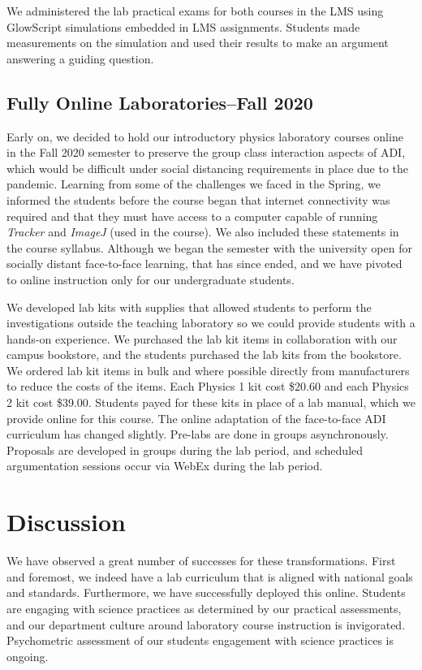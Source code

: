 \documentclass[aip, numerical, preprint]{revtex4-2}
\begin{document}
We administered the lab practical exams for both courses in the LMS using GlowScript simulations
embedded in LMS assignments. Students made measurements on the simulation and used their
results to make an argument answering a guiding question.

\subsection{Fully Online Laboratories--Fall 2020}

Early on, we decided to hold our introductory physics laboratory courses online in the Fall
2020 semester to preserve the group class interaction aspects of ADI, which would be
difficult under social distancing requirements in place due to the
pandemic.\citep{mclber20} Learning from some of the challenges we faced in the Spring, we
informed the students before the course began that internet connectivity was required and that
they must have access to a computer capable of running \emph{Tracker}\citep{bro2009} and \emph{ImageJ}\citep{schrasetal12} (used in the course). We also included these statements in the course
syllabus. Although we began the semester with the university open for socially distant
face-to-face learning, that has since ended, and we have pivoted to online instruction only for
our undergraduate students.

We developed lab kits with supplies that allowed students to perform the investigations outside
the teaching laboratory so we could provide students with a hands-on experience. We purchased
the lab kit items in collaboration with our campus bookstore, and the students purchased the
lab kits from the bookstore. We ordered lab kit items in bulk and where possible directly from
manufacturers to reduce the costs of the items. Each Physics 1 kit cost \$20.60 and each
Physics 2 kit cost \$39.00. Students payed for these kits in place of a lab manual, which we
provide online for this course.  The online adaptation of the face-to-face ADI curriculum has
changed slightly. Pre-labs are done in groups asynchronously.  Proposals are developed in
groups during the lab period, and scheduled argumentation sessions occur via WebEx during the
lab period.

\section{Discussion}
We have observed a great number of successes for these transformations.  First and foremost, we
indeed have a lab curriculum that is aligned with national goals and standards. Furthermore, we
have successfully deployed this online.  Students are engaging with science practices as
determined by our practical assessments, and our department culture around laboratory course
instruction is invigorated. Psychometric assessment of our students engagement with science
practices is ongoing.
\end{document}
